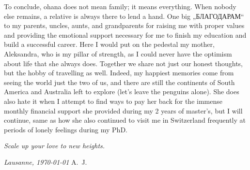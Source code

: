To conclude, ohana does not mean family; it means everything. When nobody else remains, a relative is always there to lend a hand. One big
„БЛАГОДАРАМ“
to my parents, uncles, aunts, and grandparents for raising me with proper values and providing the emotional support necessary for me to finish my education and build a successful career. Here I would put on the pedestal my mother, Aleksandra, who is my pillar of strength, as I could never have the optimism about life that she always does. Together we share not just our honest thoughts, but the hobby of travelling as well. Indeed, my happiest memories come from seeing the world just the two of us, and there are still the continents of South America and Australia left to explore (let's leave the penguins alone). She does also hate it when I attempt to find ways to pay her back for the immense monthly financial support she provided during my 2 years of master's, but I will continue, same as how she also continued to visit me in Switzerland frequently at periods of lonely feelings during my PhD. 

\bigskip

\begin{center}
    \emph{{\LARGE Scale up your love to new heights.}}
\end{center}

\bigskip
 
\noindent\textit{Lausanne, \today}
\hfill A.~J.
